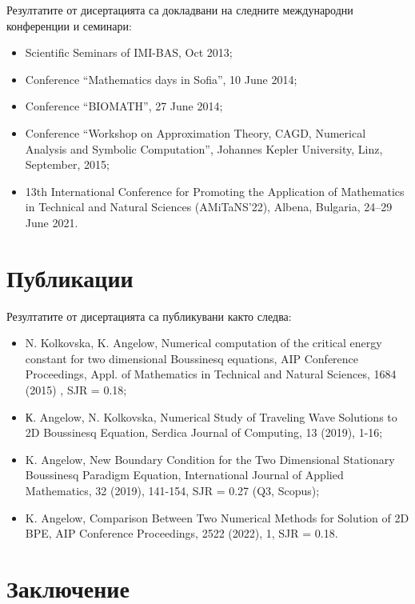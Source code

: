 \documentclass[a5paper]{article}
\theoremstyle{remark}
\begin{document}
\begin{normalsize}
Резултатите от дисертацията са докладвани на следните международни конференции и семинари:
\begin{itemize}
\item Scientific Seminars of IMI-BAS, Oct 2013;

\item Conference ``Mathematics days in Sofia'', 10 June 2014;

\item Conference ``BIOMATH'', 27 June 2014;

\item Conference ``Workshop on Approximation Theory, CAGD, Numerical Analysis and Symbolic Computation'',  Johannes Kepler University, Linz, September, 2015;

\item 13th International Conference for Promoting the Application of Mathematics in Technical and Natural Sciences (AMiTaNS’22), Albena, Bulgaria, 24–29 June 2021. 
\end{itemize}

\section{Публикации}\label{approb}

Резултатите от дисертацията са публикувани както следва:
\begin{itemize}
\item N. Kolkovska, K. Angelow, Numerical computation of the critical energy constant for two dimensional Boussinesq equations, AIP Conference Proceedings, Appl. of Mathematics in Technical and Natural Sciences, 1684 (2015) , SJR = 0.18;

\item К. Angelow, N. Kolkovska, Numerical Study of Traveling Wave Solutions to 2D Boussinesq Equation, Serdica Journal of Computing, 13 (2019), 1-16;

\item K. Angelow, New Boundary Condition for the Two Dimensional Stationary Boussinesq Paradigm Equation, International Journal of Applied Mathematics, 32 (2019), 141-154, SJR = 0.27 (Q3, Scopus);

\item K. Angelow, Comparison Between Two Numerical Methods for Solution of 2D BPE, AIP Conference Proceedings, 2522 (2022), 1, SJR = 0.18.
\end{itemize}


\section{Заключение}


\end{normalsize}
\end{document}
